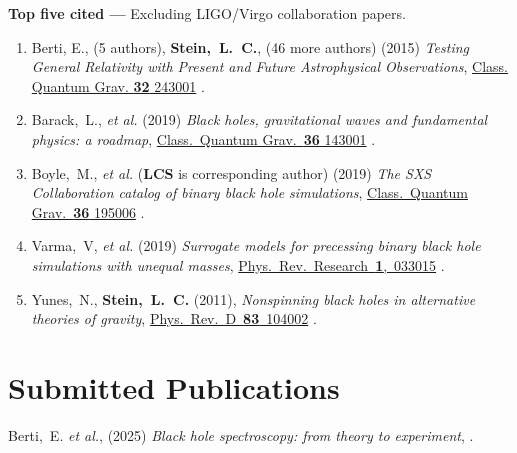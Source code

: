 {\bf Top five cited ---}%
Excluding LIGO/Virgo collaboration papers.
\begin{enumerate}
\item
  Berti, E., (5 authors), {\bf Stein,~L.~C.}, (46 more authors)
  (2015)
  {\it Testing General Relativity with Present and Future
    Astrophysical Observations},
  \href{http://dx.doi.org/10.1088/0264-9381/32/24/243001}{Class. Quantum Grav. {\bf 32} 243001}
  .
\item
  Barack,~L., {\it et al.}
  (2019)
  {\it Black holes, gravitational waves and fundamental physics: a roadmap},
  \href{https://doi.org/10.1088/1361-6382/ab0587}{Class.~Quantum Grav.~{\bf 36} 143001}
  .
\item
  Boyle,~M., {\it et al.} ({\bf LCS} is corresponding author)
  (2019)
  {\it The SXS Collaboration catalog of binary black hole simulations},
  \href{https://doi.org/10.1088/1361-6382/ab34e2}{Class.~Quantum Grav.~{\bf 36} 195006}
  .
\item
  Varma,~V, {\it et al.}
  (2019)
  {\it Surrogate models for precessing binary black hole simulations with
  unequal masses},
  \href{https://doi.org/10.1103/PhysRevResearch.1.033015}{Phys.~Rev.~Research~{\bf 1},~033015}
  .
\item
  Yunes,~N., {\bf Stein,~L.~C.}
  (2011),
  {\it Nonspinning black holes in alternative theories of gravity},
  \href{http://dx.doi.org/10.1103/PhysRevD.83.104002}{Phys.~Rev.~D~{\bf 83}~104002}
  .
\end{enumerate}
\else%
\fi

\renewcommand{\citeCount}[1]{}

\section{Submitted Publications}
\secstartswithlist{}%
\begin{etaremune}[start=\value{pubCounter}]
\item
  Berti,~E.
  {\it et al.},
  (2025)
  {\it Black hole spectroscopy: from theory to experiment},
  .
  \citeCount{0}
  \setcounter{pubCounter}{\value{enumi}}
\end{etaremune}


